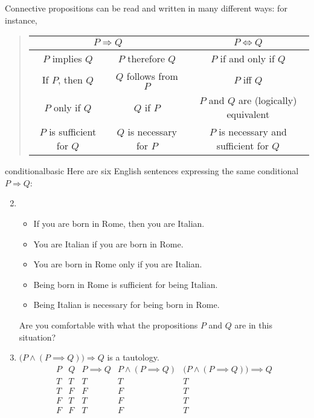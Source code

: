 Connective propositions can be read and written in many different ways: for instance,
\begin{quote}
	\def\arraystretch{1.05}
	\begin{tabular}{@{}cc|c}
		\multicolumn{2}{c|}{$P\Longrightarrow Q$} & $P\Longleftrightarrow Q$\\\hline
		$P$ implies $Q$ & $P$ therefore $Q$ & $P$ if and only if $Q$\\
		If $P$, then $Q$ & $Q$ follows from $P$ & $P$ iff $Q$\\
		$P$ only if $Q$ & $Q$ if $P$ & $P$ and $Q$ are (logically) equivalent\\
		$P$ is sufficient for $Q$ & $Q$ is necessary for $P$ & $P$ is necessary and sufficient for $Q$
	\end{tabular}
\end{quote}


\goodbreak


\begin{examples}{}{conditionalbasic}
	\exstart Here are six English sentences expressing the same conditional $P\Longrightarrow Q$:\vspace{-1pt}
	\begin{enumerate}\setcounter{enumi}{1}
	\item[]\begin{itemize}\itemsep1pt
			\item If you are born in Rome, then you are Italian. 
			\item You are Italian if you are born in Rome. 
			\item You are born in Rome only if you are Italian. 
			\item Being born in Rome is sufficient for being Italian. 
			\item Being Italian is necessary for being born in Rome. 
		\end{itemize}
		Are you comfortable with what the propositions $P$ and $Q$ are in this situation?
	
		\item\label{ex:taut2} $\bigl(P\wedge(P\implies Q)\bigr)\Longrightarrow Q$ is a tautology.
		\[
			\begin{array}{cc||c|c||c}
				P & Q & P\implies Q & P\wedge(P\implies Q) & \bigl(P\wedge(P\implies Q)\bigr)\implies Q\\\hline
				T & T & T & T& T\\
				T & F & F & F& T\\
				F & T & T & F& T\\
				F & F & T & F& T
			\end{array}
		\]
	\end{enumerate}
\end{examples}



